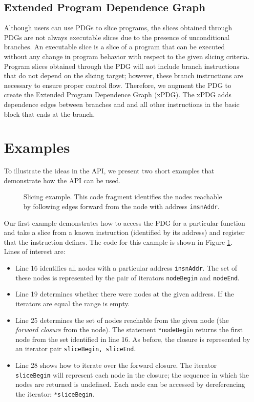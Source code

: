 \documentclass[12pt,titlepage]{article}
\begin{document}
\subsection{Extended Program Dependence Graph}
Although users can use PDGs to slice programs, the slices obtained
through PDGs are not always executable slices due to the presence of
unconditional branches. An executable slice is a slice of a program
that can be executed without any change in program behavior with
respect to the given slicing criteria. Program slices obtained through
the PDG will not include branch instructions that do not depend on the
slicing target; however, these branch instructions are necessary to
ensure proper control flow. Therefore, we augment the PDG to create
the Extended Program Dependence Graph (xPDG). The xPDG adds
dependence edges between branches and and all other instructions in
the basic block that ends at the branch. 

\section{Examples} 

To illustrate the ideas in the API, we present two short examples that
demonstrate how the API can be used.

\begin{figure}

\caption{Slicing example. This code fragment identifies the nodes
  reachable by following edges forward from the node with address
  \texttt{insnAddr}.}
\label{example1}
\end{figure}

Our first example demonstrates how to access the PDG for a particular
function and take a slice from a known instruction (identified by its
address) and register that the instruction defines. The code for this
example is shown in Figure \ref{example1}. Lines of interest are:
\begin{itemize}
\item Line 16 identifies all nodes with a particular address
  \texttt{insnAddr}. The set of these nodes is represented by the pair
  of iterators \texttt{nodeBegin} and \texttt{nodeEnd}.
\item Line 19 determines whether there were nodes at the given
  address. If the iterators are equal the range is empty.
\item Line 25 determines the set of nodes reachable from the given
  node (the \emph{forward closure} from the node). The statement
  \texttt{*nodeBegin} returns the first node from the set identified
  in line 16. As before, the closure is represented by an iterator
  pair \texttt{sliceBegin, sliceEnd}. 
\item Line 28 shows how to iterate over the forward closure. The
  iterator \texttt{sliceBegin} will represent each node in the
  closure; the sequence in which the nodes are returned is
  undefined. Each node can be accessed by dereferencing the iterator:
  \texttt{*sliceBegin}.
\end{itemize}
\end{document}
